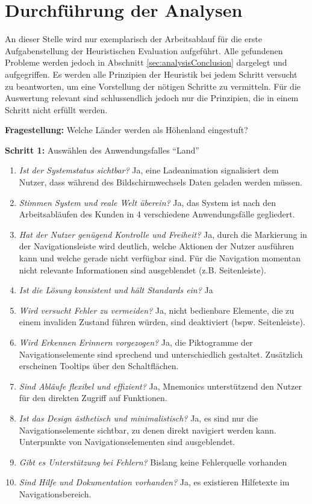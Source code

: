 \section{Durchführung der Analysen} \label{sec:analysisExecution}
An dieser Stelle wird nur exemplarisch der Arbeitsablauf für die erste Aufgabenstellung der Heuristischen Evaluation aufgeführt. Alle gefundenen Probleme werden jedoch in Abschnitt \ref{sec:analysisConclusion} dargelegt und aufgegriffen. Es werden alle Prinzipien der Heuristik bei jedem Schritt versucht zu beantworten, um eine Vorstellung der nötigen Schritte zu vermitteln. Für die Auswertung relevant sind schlussendlich jedoch nur die Prinzipien, die in einem Schritt nicht erfüllt werden.\par
\textbf{Fragestellung:} Welche Länder werden als Höhenland eingestuft?\par
\textbf{Schritt 1:} Auswählen des Anwendungsfalles \enquote{Land}
\begin{enumerate}
 \item \textit{Ist der Systemstatus sichtbar?} Ja, eine Ladeanimation signalisiert dem Nutzer, dass während des Bildschirmwechsels Daten geladen werden müssen.
 \item \textit{Stimmen System und reale Welt überein?} Ja, das System ist nach den Arbeitsabläufen des Kunden in 4 verschiedene Anwendungsfälle gegliedert.
 \item \textit{Hat der Nutzer genügend Kontrolle und Freiheit?} Ja, durch die Markierung in der Navigationsleiste wird deutlich, welche Aktionen der Nutzer ausführen kann und welche gerade nicht verfügbar sind. Für die Navigation momentan nicht relevante Informationen sind ausgeblendet (z.B. Seitenleiste).
 \item \textit{Ist die Lösung konsistent und hält Standards ein?} Ja
 \item \textit{Wird versucht Fehler zu vermeiden?} Ja, nicht bedienbare Elemente, die zu einem invaliden Zustand führen würden, sind deaktiviert (bspw. Seitenleiste).
 \item \textit{Wird Erkennen Erinnern vorgezogen?} Ja, die Piktogramme der Navigationselemente sind sprechend und unterschiedlich gestaltet. Zusätzlich erscheinen Tooltips über den Schaltflächen.
 \item \textit{Sind Abläufe flexibel und effizient?} Ja, Mnemonics unterstützend den Nutzer für den direkten Zugriff auf Funktionen.
 \item \textit{Ist das Design ästhetisch und minimalistisch?} Ja, es sind nur die Navigationselemente sichtbar, zu denen direkt navigiert werden kann. Unterpunkte von Navigationselementen sind ausgeblendet.
 \item \textit{Gibt es Unterstützung bei Fehlern?} Bislang keine Fehlerquelle vorhanden
 \item \textit{Sind Hilfe und Dokumentation vorhanden?} Ja, es existieren Hilfetexte im Navigationsbereich. 
\end{enumerate}
